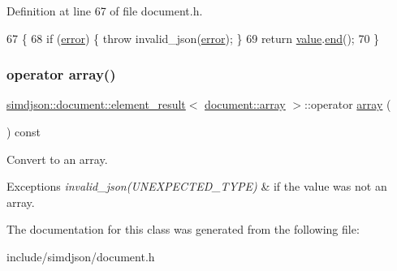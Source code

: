 Definition at line 67 of file document.\+h.


\begin{DoxyCode}
67                                                                                               \{
68   \textcolor{keywordflow}{if} (\hyperlink{classsimdjson_1_1document_1_1element__result_3_01document_1_1array_01_4_aa36a7760b8ba8a522969cf0e87eba4c9}{error}) \{ \textcolor{keywordflow}{throw} invalid\_json(\hyperlink{classsimdjson_1_1document_1_1element__result_3_01document_1_1array_01_4_aa36a7760b8ba8a522969cf0e87eba4c9}{error}); \}
69   \textcolor{keywordflow}{return} \hyperlink{classsimdjson_1_1document_1_1element__result_3_01document_1_1array_01_4_a2b9e99aedf1d1c2760aefee088144e61}{value}.\hyperlink{classsimdjson_1_1document_1_1array_ab63f33e3cf8283595472fe6e1325ced8}{end}();
70 \}
\end{DoxyCode}
\mbox{\label{classsimdjson_1_1document_1_1element__result_3_01document_1_1array_01_4_a427bcc2cd2ca7bf233e10418d62c6082}} 
\subsubsection{\texorpdfstring{operator array()}{operator array()}}
{\footnotesize\ttfamily \hyperlink{classsimdjson_1_1document_1_1element__result}{simdjson\+::document\+::element\+\_\+result}$<$ \hyperlink{classsimdjson_1_1document_1_1array}{document\+::array} $>$\+::operator \hyperlink{classsimdjson_1_1document_1_1array}{array} (\begin{DoxyParamCaption}{ }\end{DoxyParamCaption}) const\hspace{0.3cm}{\ttfamily [noexcept]}}



Convert to an array. 


\begin{DoxyExceptions}{Exceptions}
{\em invalid\+\_\+json(\+U\+N\+E\+X\+P\+E\+C\+T\+E\+D\+\_\+\+T\+Y\+P\+E)} & if the value was not an array. \\
\hline
\end{DoxyExceptions}


The documentation for this class was generated from the following file\+:\begin{DoxyCompactItemize}
\item 
include/simdjson/document.\+h\end{DoxyCompactItemize}
